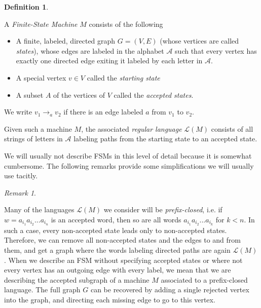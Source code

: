 \documentclass{amsart}
\theoremstyle{definition}
\newtheorem{definition}[theorem]{Definition}
\theoremstyle{remark}
\newtheorem{remark}[theorem]{Remark}
\begin{document}
	\begin{definition} \label{FSMDef}
		
		A \textit{Finite-State Machine} $M$ consists of the following
		
		\begin{itemize}
			\item A finite, labeled, directed graph $G=(V,E)$ (whose vertices are called \textit{states}), whose edges are labeled in the alphabet $\mathscr{A}$ such that every vertex has exactly one directed edge exiting it labeled by each letter in $\mathscr{A}$.
			\item A special vertex $v\in V$ called the \textit{starting state}	
			\item A subset $A$ of the vertices of $V$ called the \textit{accepted states}.
		\end{itemize}
		
		We write $v_1\to_{a} v_2$ if there is an edge labeled $a$ from $v_1$ to $v_2$.
		
		Given such a machine $M$, the associated \textit{regular language} $\mathscr{L}(M)$ consists of all strings of letters in $\mathscr{A}$ labeling paths from the starting state to an accepted state.
		
	\end{definition}
	
	We will usually not describe FSMs in this level of detail because it is somewhat cumbersome. The following remarks provide some simplifications we will usually use tacitly.
	
	\begin{remark}\label{PrefixClosedLanguages}
		
		Many of the languages $\mathscr{L}(M)$ we consider will be \textit{prefix-closed}, i.e. if $w=a_{i_1}a_{i_2}...a_{i_n}$ is an accepted word, then so are all words $a_{i_1}a_{i_2}...a_{i_k}$ for $k<n$. In such a case, every non-accepted state leads only to non-accepted states. Therefore, we can remove all non-accepted states and the edges to and from them, and get a graph where the words labeling directed paths are again $\mathscr{L}(M)$. When we describe an FSM without specifying accepted states or where not every vertex has an outgoing edge with every label, we mean that we are describing the accepted subgraph of a machine $M$ associated to a prefix-closed language. The full graph $G$ can be recovered by adding a single rejected vertex into the graph, and directing each missing edge to go to this vertex.
		
	\end{remark}
	
\end{document}
